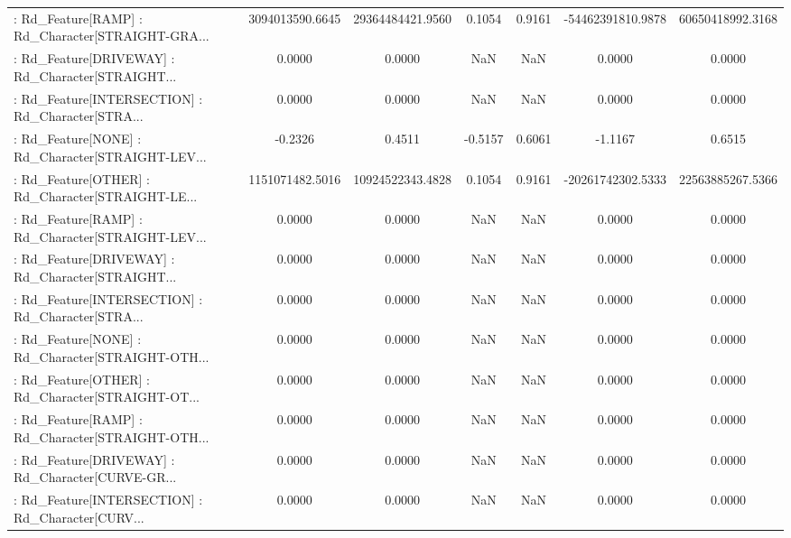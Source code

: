 \begin{longtable}{p{4cm}cccccc}
 : Rd\_Feature[RAMP] : Rd\_Character[STRAIGHT-GRA... &   3094013590.6645 &  29364484421.9560 &  0.1054 &       0.9161 &  -54462391810.9878 &  60650418992.3168 \\
 : Rd\_Feature[DRIVEWAY] : Rd\_Character[STRAIGHT... &            0.0000 &            0.0000 &     NaN &          NaN &             0.0000 &            0.0000 \\
 : Rd\_Feature[INTERSECTION] : Rd\_Character[STRA... &            0.0000 &            0.0000 &     NaN &          NaN &             0.0000 &            0.0000 \\
 : Rd\_Feature[NONE] : Rd\_Character[STRAIGHT-LEV... &           -0.2326 &            0.4511 & -0.5157 &       0.6061 &            -1.1167 &            0.6515 \\
 : Rd\_Feature[OTHER] : Rd\_Character[STRAIGHT-LE... &   1151071482.5016 &  10924522343.4828 &  0.1054 &       0.9161 &  -20261742302.5333 &  22563885267.5366 \\
 : Rd\_Feature[RAMP] : Rd\_Character[STRAIGHT-LEV... &            0.0000 &            0.0000 &     NaN &          NaN &             0.0000 &            0.0000 \\
 : Rd\_Feature[DRIVEWAY] : Rd\_Character[STRAIGHT... &            0.0000 &            0.0000 &     NaN &          NaN &             0.0000 &            0.0000 \\
 : Rd\_Feature[INTERSECTION] : Rd\_Character[STRA... &            0.0000 &            0.0000 &     NaN &          NaN &             0.0000 &            0.0000 \\
 : Rd\_Feature[NONE] : Rd\_Character[STRAIGHT-OTH... &            0.0000 &            0.0000 &     NaN &          NaN &             0.0000 &            0.0000 \\
 : Rd\_Feature[OTHER] : Rd\_Character[STRAIGHT-OT... &            0.0000 &            0.0000 &     NaN &          NaN &             0.0000 &            0.0000 \\
 : Rd\_Feature[RAMP] : Rd\_Character[STRAIGHT-OTH... &            0.0000 &            0.0000 &     NaN &          NaN &             0.0000 &            0.0000 \\
 : Rd\_Feature[DRIVEWAY] : Rd\_Character[CURVE-GR... &            0.0000 &            0.0000 &     NaN &          NaN &             0.0000 &            0.0000 \\
 : Rd\_Feature[INTERSECTION] : Rd\_Character[CURV... &            0.0000 &            0.0000 &     NaN &          NaN &             0.0000 &            0.0000 \\

\end{longtable}
